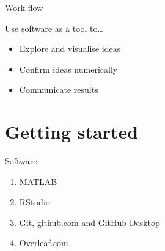\documentclass[,aspectratio=169]{beamer}
\begin{document}
\begin{frame}{Work flow}
\protect\hypertarget{work-flow}{}
\usetikzlibrary{arrows}

\begin{center}
\huge
{}
\end{center}

Use software as a tool to\ldots{}

\begin{itemize}
\item
  Explore and visualise ideas
\item
  Confirm ideas numerically
\item
  Communicate results
\end{itemize}
\end{frame}

\hypertarget{getting-started-1}{%
\section{Getting started}\label{getting-started-1}}

\begin{frame}{Software}
\protect\hypertarget{software}{}
\begin{enumerate}
\item
  MATLAB
\item
  RStudio
\item
  Git, github.com and GitHub Desktop
\item
  Overleaf.com
\end{enumerate}
\end{frame}
\end{document}
